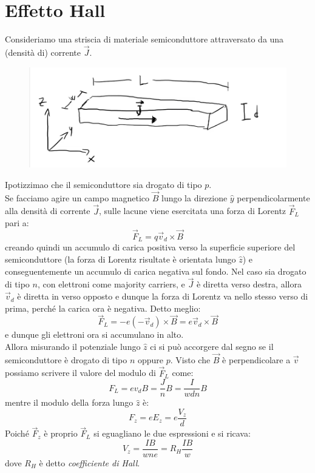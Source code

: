 \documentclass{book}
\begin{document}
    \section{Effetto Hall}
        Consideriamo una striscia di materiale semiconduttore attraversato da una (densità di) corrente $\vec{J}$.
        \begin{figure}[h!]
            \centering
            \includegraphics[width=0.5\linewidth]{img/striscia.png}
        \end{figure}
        Ipotizzimao che il semiconduttore sia drogato di tipo $p$.\\
        Se facciamo agire un campo magnetico $\vec{B}$ lungo la direzione $\hat{y}$ perpendicolarmente alla densità di corrente $\vec{J}$, sulle lacune viene esercitata una forza di Lorentz $\vec{F}_{L}$ pari a:
        $$\vec{F}_{L} = q\vec{v}_{d} \times \vec{B}$$
        creando quindi un accumulo di carica positiva verso la superficie superiore del semiconduttore (la forza di Lorentz risultate è orientata lungo $\hat{z}$) e conseguentemente un accumulo di carica negativa sul fondo.
        Nel caso sia drogato di tipo $n$, con elettroni come majority carriers, e $\vec{J}$ è diretta verso destra, allora $\vec{v}_{d}$ è diretta in verso opposto e dunque la forza di Lorentz va nello stesso verso di prima, perché la carica ora è negativa. Detto meglio:
        $$\vec{F}_{L} = -e (-\vec{v}_{d}) \times \vec{B} = e \vec{v}_{d} \times \vec{B}$$
        e dunque gli elettroni ora si accumulano in alto.\\
        Allora misurando il potenziale lungo $\hat{z}$ ci si può accorgere dal segno se il semiconduttore è drogato di tipo $n$ oppure $p$.
        Visto che $\vec{B}$ è perpendicolare a $\vec{v}$ possiamo scrivere il valore del modulo di $\vec{F}_{L}$ come:
        $$F_{L} = ev_{d}B = \frac{J}{n} B = \frac{I}{wd n} B$$
        mentre il modulo della forza lungo $\hat{z}$ è:
        $$F_{z} = eE_{z} = e \frac{V_{z}}{d}$$
        Poiché $\vec{F}_{z}$ è proprio $\vec{F}_{L}$ si eguagliano le due espressioni e si ricava:
        $$V_{z} = \frac{I B}{wne} = R_{H} \frac{IB}{w}$$
        dove $R_{H}$ è detto \textit{coefficiente di Hall}.
\end{document}
